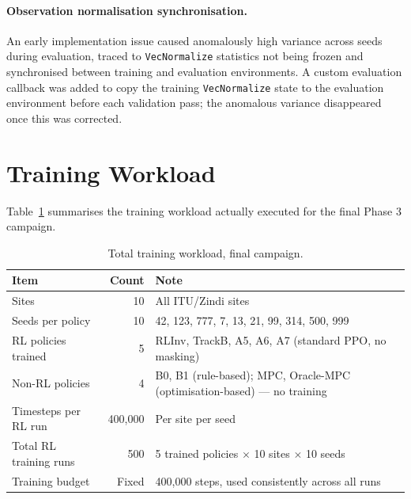 \paragraph{Observation normalisation synchronisation.} An early
implementation issue caused anomalously high variance across seeds
during evaluation, traced to \texttt{VecNormalize} statistics not being
frozen and synchronised between training and evaluation environments. A
custom evaluation callback was added to copy the training
\texttt{VecNormalize} state to the evaluation environment before each
validation pass; the anomalous variance disappeared once this was
corrected.


\section{Training Workload}
\label{sec:training_execution}

Table~\ref{tab:training_workload} summarises the training workload
actually executed for the final Phase 3 campaign.

\begin{table}[htb]
\centering
\small
\setlength{\tabcolsep}{5pt}
\caption{Total training workload, final campaign.}
\label{tab:training_workload}
\begin{tabular}{lrp{5.8cm}}
\toprule
\textbf{Item} & \textbf{Count} & \textbf{Note} \\
\midrule
Sites                    & 10  & All ITU/Zindi sites \\
Seeds per policy         & 10  & 42, 123, 777, 7, 13, 21, 99, 314, 500, 999 \\
RL policies trained      & 5   & RLInv, TrackB, A5, A6, A7 (standard PPO,
                                 no masking) \\
Non-RL policies          & 4   & B0, B1 (rule-based); MPC, Oracle-MPC
                                 (optimisation-based) --- no training \\
Timesteps per RL run     & 400{,}000 & Per site per seed \\
Total RL training runs   & 500 & 5 trained policies $\times$ 10 sites
                                 $\times$ 10 seeds \\
Training budget          & Fixed & 400{,}000 steps, used consistently across all runs \\
\bottomrule
\end{tabular}
\end{table}

